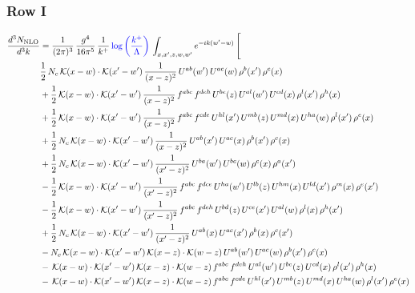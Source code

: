 \documentclass[9pt]{article}
\numberwithin{equation}{section}
\begin{document}
\subsubsection{Row I}
\begin{align}
\frac{d^{3}N_{\mathrm{NLO}}}{d^{3}k} & = \frac{1}{(2\pi)^{3}}\,\frac{g^{4}}{16\pi^{5}}\,\frac{1}{k^{+}}\,{\color{blue}\log{\left(\frac{k^{+}}{\Lambda}\right)}}\,\int_{x,x',z,w,w'}e^{-ik(w'-w)}\,\Bigg[\notag\\ & \frac{1}{2}\,N_{c}\,\mathcal{K}(x-w)\cdot\mathcal{K}(x'-w')\,\frac{1}{(x-z)^{2}}\,U^{ab}(w')\,U^{ac}(w)\,\rho^{b}(x')\,\rho^{c}(x)\notag\\
& +\frac{1}{2}\,\mathcal{K}(x-w)\cdot\mathcal{K}(x'-w')\,\frac{1}{(x-z)^{2}}\,f^{abc}\,f^{deh}\,U^{be}(z)\,U^{al}(w')\,U^{cd}(x)\,\rho^{l}(x')\,\rho^{h}(x)\notag\\
& +\frac{1}{2}\,\mathcal{K}(x-w)\cdot\mathcal{K}(x'-w')\,\frac{1}{(x-z)^{2}}\,f^{abc}\,f^{cde}\,U^{hl}(x')\,U^{mb}(z)\,U^{md}(x)\,U^{ha}(w)\,\rho^{l}(x')\,\rho^{e}(x)\notag\\
& +\frac{1}{2}\,N_{c}\,\mathcal{K}(x-w)\cdot\mathcal{K}(x'-w')\,\frac{1}{(x-z)^{2}}\,U^{ab}(x')\,U^{ac}(x)\,\rho^{b}(x')\,\rho^{c}(x)\notag\\
& +\frac{1}{2}\,N_{c}\,\mathcal{K}(x-w)\cdot\mathcal{K}(x'-w')\,\frac{1}{(x'-z)^{2}}\,U^{ba}(w')\,U^{bc}(w)\,\rho^{c}(x)\,\rho^{a}(x')\notag\\
& -\frac{1}{2}\,\mathcal{K}(x-w)\cdot\mathcal{K}(x'-w')\,\frac{1}{(x'-z)^{2}}\,f^{abc}\,f^{dce}\,U^{ha}(w')\,U^{lb}(z)\,U^{hm}(x)\,U^{ld}(x')\,\rho^{m}(x)\,\rho^{e}(x')\notag\\
& -\frac{1}{2}\,\mathcal{K}(x-w)\cdot\mathcal{K}(x'-w')\,\frac{1}{(x'-z)^{2}}\,f^{abc}\,f^{deh}\,U^{bd}(z)\,U^{ce}(x')\,U^{al}(w)\,\rho^{l}(x)\,\rho^{h}(x')\notag\\
& +\frac{1}{2}\,N_{c}\,\mathcal{K}(x-w)\cdot\mathcal{K}(x'-w')\,\frac{1}{(x'-z)^{2}}\,U^{ab}(x)\,U^{ac}(x')\,\rho^{b}(x)\,\rho^{c}(x')\notag\\
& -N_{c}\,\mathcal{K}(x-w)\cdot\mathcal{K}(x'-w')\,\mathcal{K}(x-z)\cdot\mathcal{K}(w-z)\,U^{ab}(w')\,U^{ac}(w)\,\rho^{b}(x')\,\rho^{c}(x)\notag\\
& -\,\mathcal{K}(x-w)\cdot\mathcal{K}(x'-w')\,\mathcal{K}(x-z)\cdot\mathcal{K}(w-z)\,f^{abc}\,f^{deh}\,U^{al}(w')\,U^{be}(z)\,U^{cd}(x)\,\rho^{l}(x')\,\rho^{h}(x)\notag\\
& -\,\mathcal{K}(x-w)\cdot\mathcal{K}(x'-w')\,\mathcal{K}(x-z)\cdot\mathcal{K}(w-z)\,f^{abc}\,f^{cde}\,U^{hl}(x')\,U^{mb}(z)\,U^{md}(x)\,U^{ha}(w)\,\rho^{l}(x')\,\rho^{e}(x)\notag\\

\end{align}
\end{document}
